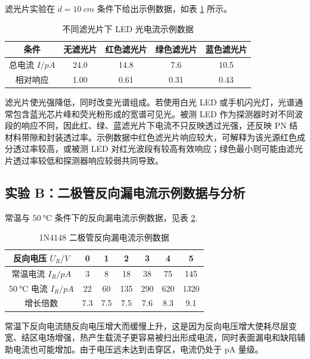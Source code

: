 \documentclass[11pt]{article}
\begin{document}
滤光片实验在 $d=\SI{10}{cm}$ 条件下给出示例数据，如表 \ref{tab:led-filter} 所示。

\begin{table}[H]
    \centering
    \caption{不同滤光片下 LED 光电流示例数据}
    \label{tab:led-filter}
    \begin{tabular}{ccccc}
        \toprule
        条件 & 无滤光片 & 红色滤光片 & 绿色滤光片 & 蓝色滤光片 \\
        \midrule
        总电流 $I/\si{pA}$ & 24.0 & 14.8 & 7.6 & 10.5 \\
        相对响应 & 1.00 & 0.61 & 0.31 & 0.43 \\
        \bottomrule
    \end{tabular}
\end{table}

滤光片使光强降低，同时改变光谱组成。若使用白光 LED 或手机闪光灯，光谱通常包含蓝光芯片峰和荧光粉形成的宽谱可见光。被测 LED 作为探测器时对不同波段的响应不同，因此红、绿、蓝滤光片下电流不只反映透过光强，还反映 PN 结材料带隙和封装透过率。示例数据中红色滤光片响应较大，可解释为该光源红色成分透过率较高，或被测 LED 对红光波段有较高有效响应；绿色最小则可能由滤光片透过率较低和探测器响应较弱共同导致。

\subsection{实验 B：二极管反向漏电流示例数据与分析}

常温与 $\SI{50}{\degreeCelsius}$ 条件下的反向漏电流示例数据，见表 \ref{tab:diode}.

\begin{table}[H]
    \centering
    \caption{1N4148 二极管反向漏电流示例数据}
    \label{tab:diode}
    \begin{tabular}{ccccccc}
        \toprule
        反向电压 $U_R/\si{V}$ & 0 & 1 & 2 & 3 & 4 & 5 \\
        \midrule
        常温电流 $I_R/\si{pA}$ & 3 & 8 & 18 & 38 & 75 & 145 \\
        $\SI{50}{\degreeCelsius}$ 电流 $I_R/\si{pA}$ & 22 & 60 & 135 & 290 & 620 & 1320 \\
        增长倍数 & 7.3 & 7.5 & 7.5 & 7.6 & 8.3 & 9.1 \\
        \bottomrule
    \end{tabular}
\end{table}

常温下反向电流随反向电压增大而缓慢上升，这是因为反向电压增大使耗尽层变宽、结区电场增强，热产生载流子更容易被扫出形成电流，同时表面漏电和缺陷辅助电流也可能增加。由于电压远未达到击穿区，电流仍处于 pA 量级。
\end{document}
